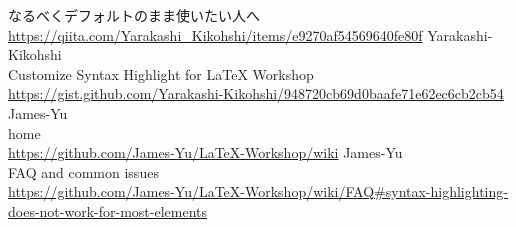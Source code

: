 \documentclass{ltjsarticle}
\begin{document}
\begin{thebibliography}{999}
  なるべくデフォルトのまま使いたい人へ\\
  \url{https://qiita.com/Yarakashi_Kikohshi/items/e9270af54569640fe80f}
  Yarakashi-Kikohshi\\
  Customize Syntax Highlight for LaTeX Workshop\\
  \url{https://gist.github.com/Yarakashi-Kikohshi/948720cb69d0baafe71e62ec6cb2cb54}
  James-Yu\\
  home\\
  \url{https://github.com/James-Yu/LaTeX-Workshop/wiki}
  James-Yu\\
  FAQ and common issues\\
  \url{https://github.com/James-Yu/LaTeX-Workshop/wiki/FAQ#syntax-highlighting-does-not-work-for-most-elements}
  
\end{thebibliography}
\end{document}
